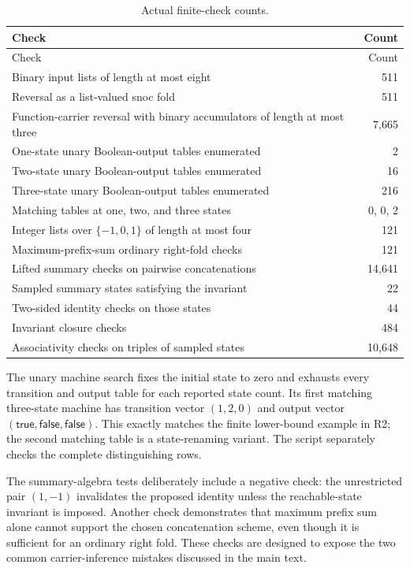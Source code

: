 \documentclass[11pt,a4paper]{article}
\theoremstyle{definition}
\theoremstyle{remark}
\begin{document}
\begin{longtable}{@{}L{97mm}r@{}}
\caption{Actual finite-check counts.}\label{tab:checks}\\
\toprule Check & Count\\\midrule
\endfirsthead
\toprule Check & Count\\\midrule
\endhead
Binary input lists of length at most eight & 511\\
Reversal as a list-valued snoc fold & 511\\
Function-carrier reversal with binary accumulators of length at most three & 7,665\\
One-state unary Boolean-output tables enumerated & 2\\
Two-state unary Boolean-output tables enumerated & 16\\
Three-state unary Boolean-output tables enumerated & 216\\
Matching tables at one, two, and three states & 0, 0, 2\\
Integer lists over $\{-1,0,1\}$ of length at most four & 121\\
Maximum-prefix-sum ordinary right-fold checks & 121\\
Lifted summary checks on pairwise concatenations & 14,641\\
Sampled summary states satisfying the invariant & 22\\
Two-sided identity checks on those states & 44\\
Invariant closure checks & 484\\
Associativity checks on triples of sampled states & 10,648\\
\bottomrule
\end{longtable}

The unary machine search fixes the initial state to zero and exhausts every
transition and output table for each reported state count. Its first matching
three-state machine has transition vector $(1,2,0)$ and output vector
$(\mathsf{true},\mathsf{false},\mathsf{false})$. This exactly matches the
finite lower-bound example in R2; the second matching table is a state-renaming
variant. The script separately checks the complete distinguishing rows.

The summary-algebra tests deliberately include a negative check: the unrestricted
pair $(1,-1)$ invalidates the proposed identity unless the reachable-state
invariant is imposed. Another check demonstrates that maximum prefix sum alone
cannot support the chosen concatenation scheme, even though it is sufficient
for an ordinary right fold. These checks are designed to expose the two common
carrier-inference mistakes discussed in the main text.
\end{document}
